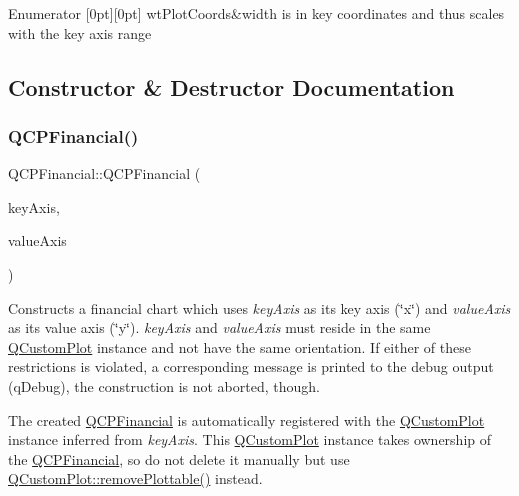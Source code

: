 \begin{DoxyEnumFields}{Enumerator}
[0pt][0pt]{}\mbox{\label{class_q_c_p_financial_aef1761dda71a53dc5269685e9e492626aebf2679f42649543a6cf372741d03ea3}} 
wt\+Plot\+Coords&width is in key coordinates and thus scales with the key axis range \\
\hline

\end{DoxyEnumFields}


\subsection{Constructor \& Destructor Documentation}
\mbox{\label{class_q_c_p_financial_a4702d5248feeb9d1ec6e3ce725b10b32}} 
\subsubsection{\texorpdfstring{Q\+C\+P\+Financial()}{QCPFinancial()}}
{\footnotesize\ttfamily Q\+C\+P\+Financial\+::\+Q\+C\+P\+Financial (\begin{DoxyParamCaption}\item[{\hyperlink{class_q_c_p_axis}{Q\+C\+P\+Axis} $\ast$}]{key\+Axis,  }\item[{\hyperlink{class_q_c_p_axis}{Q\+C\+P\+Axis} $\ast$}]{value\+Axis }\end{DoxyParamCaption})\hspace{0.3cm}{\ttfamily [explicit]}}

Constructs a financial chart which uses {\itshape key\+Axis} as its key axis (\char`\"{}x\char`\"{}) and {\itshape value\+Axis} as its value axis (\char`\"{}y\char`\"{}). {\itshape key\+Axis} and {\itshape value\+Axis} must reside in the same \hyperlink{class_q_custom_plot}{Q\+Custom\+Plot} instance and not have the same orientation. If either of these restrictions is violated, a corresponding message is printed to the debug output (q\+Debug), the construction is not aborted, though.

The created \hyperlink{class_q_c_p_financial}{Q\+C\+P\+Financial} is automatically registered with the \hyperlink{class_q_custom_plot}{Q\+Custom\+Plot} instance inferred from {\itshape key\+Axis}. This \hyperlink{class_q_custom_plot}{Q\+Custom\+Plot} instance takes ownership of the \hyperlink{class_q_c_p_financial}{Q\+C\+P\+Financial}, so do not delete it manually but use \hyperlink{class_q_custom_plot_af3dafd56884208474f311d6226513ab2}{Q\+Custom\+Plot\+::remove\+Plottable()} instead. 

